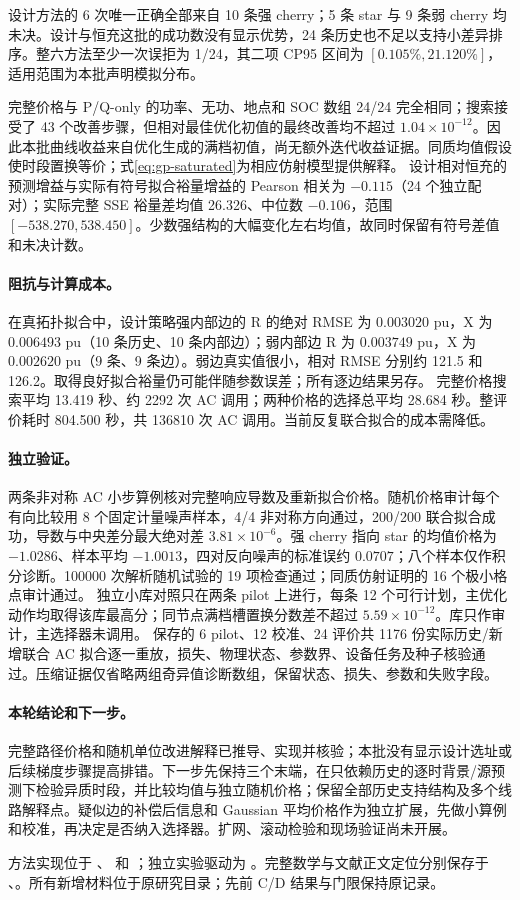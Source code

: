 设计方法的 6 次唯一正确全部来自 10 条强 cherry；5 条 star 与 9 条弱 cherry 均未决。设计与恒充这批的成功数没有显示优势，24 条历史也不足以支持小差异排序。整六方法至少一次误拒为 1/24，其二项 CP95 区间为 $[0.105\%,21.120\%]$，适用范围为本批声明模拟分布。

完整价格与 P/Q-only 的功率、无功、地点和 SOC 数组 24/24 完全相同；搜索接受了 43 个改善步骤，但相对最佳优化初值的最终改善均不超过 $1.04\times10^{-12}$。因此本批曲线收益来自优化生成的满档初值，尚无额外迭代收益证据。同质均值假设使时段置换等价；式\eqref{eq:gp-saturated}为相应仿射模型提供解释。
设计相对恒充的预测增益与实际有符号拟合裕量增益的 Pearson 相关为 $-0.115$（24 个独立配对）；实际完整 SSE 裕量差均值 26.326、中位数 $-0.106$，范围 $[-538.270,538.450]$。少数强结构的大幅变化左右均值，故同时保留有符号差值和未决计数。

\paragraph{阻抗与计算成本。}
在真拓扑拟合中，设计策略强内部边的 R 的绝对 RMSE 为 $0.003020$ pu，X 为 $0.006493$ pu（10 条历史、10 条内部边）；弱内部边 R 为 $0.003749$ pu，X 为 $0.002620$ pu（9 条、9 条边）。弱边真实值很小，相对 RMSE 分别约 121.5 和 126.2。取得良好拟合裕量仍可能伴随参数误差；所有逐边结果另存。
完整价格搜索平均 13.419 秒、约 2292 次 AC 调用；两种价格的选择总平均 28.684 秒。整评价耗时 804.500 秒，共 136810 次 AC 调用。当前反复联合拟合的成本需降低。

\paragraph{独立验证。}
两条非对称 AC 小步算例核对完整响应导数及重新拟合价格。随机价格审计每个有向比较用 8 个固定计量噪声样本，4/4 非对称方向通过，200/200 联合拟合成功，导数与中央差分最大绝对差 $3.81\times10^{-6}$。强 cherry 指向 star 的均值价格为 $-1.0286$、样本平均 $-1.0013$，四对反向噪声的标准误约 $0.0707$；八个样本仅作积分诊断。100000 次解析随机试验的 19 项检查通过；同质仿射证明的 16 个极小格点审计通过。
独立小库对照只在两条 pilot 上进行，每条 12 个可行计划，主优化动作均取得该库最高分；同节点满档槽置换分数差不超过 $5.59\times10^{-12}$。库只作审计，主选择器未调用。
保存的 6 pilot、12 校准、24 评价共 1176 份实际历史/新增联合 AC 拟合逐一重放，损失、物理状态、参数界、设备任务及种子核验通过。压缩证据仅省略两组奇异值诊断数组，保留状态、损失、参数和失败字段。

\paragraph{本轮结论和下一步。}
完整路径价格和随机单位改进解释已推导、实现并核验；本批没有显示设计选址或后续梯度步骤提高排错。下一步先保持三个末端，在只依赖历史的逐时背景/源预测下检验异质时段，并比较均值与独立随机价格；保留全部历史支持结构及多个线路解释点。疑似边的补偿后信息和 Gaussian 平均价格作为独立扩展，先做小算例和校准，再决定是否纳入选择器。扩网、滚动检验和现场验证尚未开展。

方法实现位于 、 和 ；独立实验驱动为 。完整数学与文献正文定位分别保存于 、。所有新增材料位于原研究目录；先前 C/D 结果与门限保持原记录。
